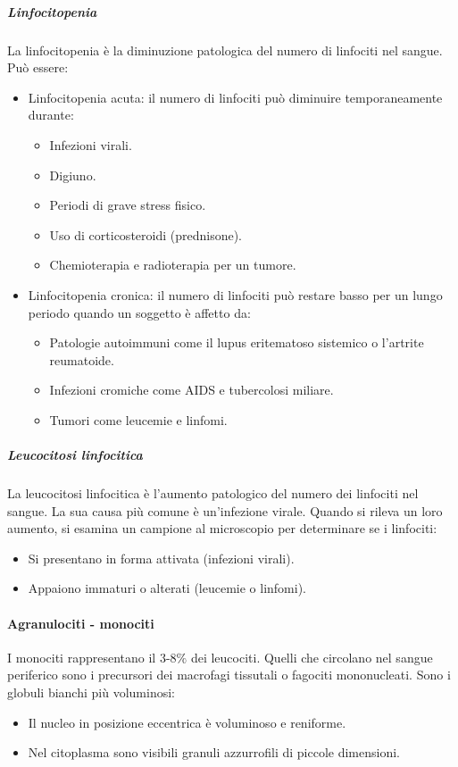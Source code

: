				\subparagraph{Linfocitopenia}
				La linfocitopenia \`e la diminuzione patologica del numero di linfociti nel sangue.
				Pu\`o essere:
		\begin{multicols}{2}
				\begin{itemize}
					\item Linfocitopenia acuta: il numero di linfociti pu\`o diminuire temporaneamente durante:
						\begin{itemize}
							\item Infezioni virali.
							\item Digiuno.
							\item Periodi di grave stress fisico.
							\item Uso di corticosteroidi (prednisone).
							\item Chemioterapia e radioterapia per un tumore.
						\end{itemize}
					\item Linfocitopenia cronica: il numero di linfociti pu\`o restare basso per un lungo periodo quando un soggetto \`e affetto da: 
						\begin{itemize}
							\item Patologie autoimmuni come il lupus eritematoso sistemico o l'artrite reumatoide.
							\item Infezioni cromiche come AIDS e tubercolosi miliare.
							\item Tumori come leucemie e linfomi.
						\end{itemize}
				\end{itemize}
			\end{multicols}
				
				\subparagraph{Leucocitosi linfocitica}
				La leucocitosi linfocitica \`e l'aumento patologico del numero dei linfociti nel sangue. 
				La sua causa pi\`u comune \`e un'infezione virale.
				Quando si rileva un loro aumento, si esamina un campione al microscopio per determinare se i linfociti:
		\begin{multicols}{2}
				\begin{itemize}
					\item Si presentano in forma attivata (infezioni virali).
					\item Appaiono immaturi o alterati (leucemie o linfomi).
				\end{itemize}
			\end{multicols}
			\paragraph{Agranulociti - monociti}
			I monociti rappresentano il $3$-$8\%$ dei leucociti. 
			Quelli che circolano nel sangue periferico sono i precursori dei macrofagi tissutali o fagociti mononucleati. 
			Sono i globuli bianchi pi\`u voluminosi:
		\begin{multicols}{2}
			\begin{itemize}
				\item Il nucleo in posizione eccentrica \`e voluminoso e reniforme.
				\item Nel citoplasma sono visibili granuli azzurrofili di piccole dimensioni.
			\end{itemize}
		\end{multicols}

